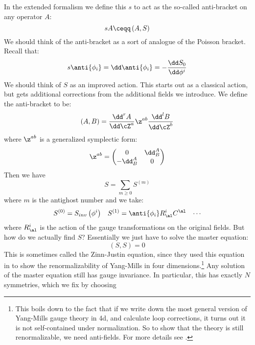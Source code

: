 \documentclass{booc}
\begin{document}
In the extended formalism we define this $s$ to act as the so-called anti-bracket on any operator $A$:
\begin{equation}
sA \ceqq
\left( A , S \right)
\end{equation}
We should think of the anti-bracket as a sort of analogue of the Poisson bracket.
Recall that:
\begin{equation}
s \anti{\phi_i} = \dd \anti{\phi_i} = 
-\frac{\dd S_0}{\dd \phi^i}
\end{equation}
We should think of $S$ as an improved action. This starts out as a classical action, but
gets additional corrections from the additional fields we introduce.
We define the anti-bracket to be:
\begin{equation}
\left( A , B \right) =
\frac{\dd^r A}{\dd \cZ^a}
\z^{ab} \frac{\dd^l B}{\dd \cZ^b}
\end{equation}
where $\z^{ab}$ is a generalized symplectic form:
\begin{equation}
\z^{ab} = 
\begin{pmatrix}
0 & \dd^A_B \\ 
-\dd^{A}_B & 0
\end{pmatrix}
\end{equation}
Then we have
\begin{equation}
S = \sum_{m\geq 0} S^{\left( m \right)}
\end{equation}
where $m$ is the antighost number and we take:
\begin{align}
S^{\left( 0 \right)} = S_{inv}\left( \phi^i \right)
&&
S^{\left( 1 \right)} = \anti{\phi_i}R^i_\al C^\al
&&
\cdots
\end{align}
where $R^i_\al$ is the action of the gauge transformations on the original fields.
But how do we actually find $S$?
Essentially we just have to solve the master equation:
\begin{equation}
\left( S , S \right) = 0
\end{equation}
This is sometimes called the Zinn-Justin equation, since they used this equation in \cite{ym_renorm}
to show the renormalizability of Yang-Mills in four dimensions.\footnote{
This boils down to the fact that if we write down the most general version of
Yang-Mills gauge theory in 4d, and calculate loop corrections, it turns out it is not self-contained
under normalization. So to show that the theory is still renormalizable, we need anti-fields.
For more details see \cite{zinn_justin}.}
Any solution of the master equation still has gauge invariance.
In particular, this has exactly $N$ symmetries, which we fix by choosing
\end{document}
